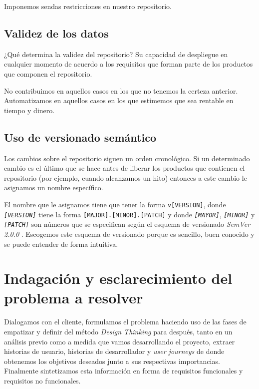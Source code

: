 Imponemos sendas restricciones en nuestro repositorio.

\subsection{Validez de los datos}

¿Qué determina la validez del repositorio? Su capacidad de despliegue en cualquier
momento de acuerdo a los requisitos que forman parte de los productos que componen
el repositorio.

No contribuimos en aquellos casos en los que no tenemos la certeza anterior.
Automatizamos en aquellos casos en los que estimemos que sea rentable en tiempo
y dinero.

\subsection{Uso de versionado semántico}

Los cambios sobre el repositorio siguen un orden cronológico.
Si un determinado cambio es el último que se hace antes de
liberar los productos que contienen el repositorio (por ejemplo,
cuando alcanzamos un hito) entonces a este cambio le asignamos
un nombre específico.

El nombre que le asignamos tiene que tener la forma \texttt{v[VERSION]},
donde \textit{\texttt{[VERSION]}} tiene la forma \texttt{[MAJOR].[MINOR].[PATCH]} y donde
\textit{\texttt{[MAYOR]}}, \textit{\texttt{[MINOR]}} y \textit{\texttt{[PATCH]}} son números que se
especifican según el esquema de versionado \textit{SemVer 2.0.0} \cite{SemVer}.
Escogemos este esquema de versionado porque es sencillo, buen conocido y se puede
entender de forma intuitiva.

\section{Indagación y esclarecimiento del problema a resolver}

Dialogamos con el cliente, formulamos el problema haciendo uso de las fases de
empatizar y definir del método \textit{Design Thinking} para después, tanto en un análisis
previo como a medida que vamos desarrollando el proyecto, extraer historias de usuario, historias de
desarrollador y \textit{user journeys} de donde obtenemos los objetivos deseados
junto a sus respectivas importancias.
Finalmente sintetizamos esta información en forma de requisitos funcionales y
requisitos no funcionales.

